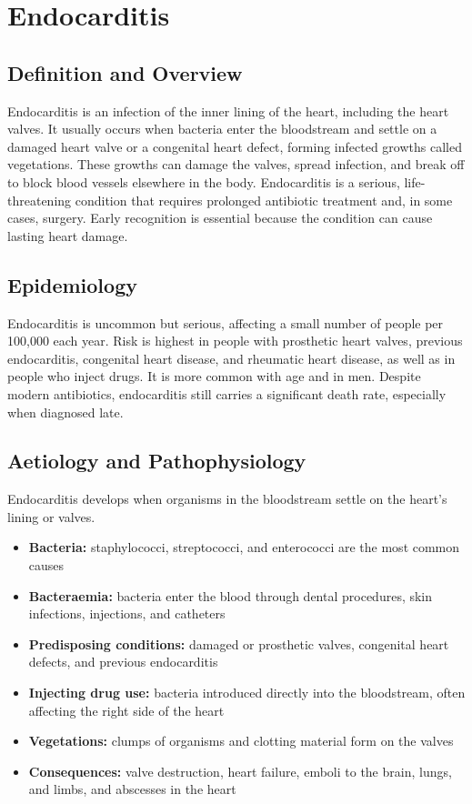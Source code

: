 \chapter{Endocarditis}

\section*{Definition and Overview}
Endocarditis is an infection of the inner lining of the heart, including the heart valves. It usually occurs when bacteria enter the bloodstream and settle on a damaged heart valve or a congenital heart defect, forming infected growths called vegetations. These growths can damage the valves, spread infection, and break off to block blood vessels elsewhere in the body. Endocarditis is a serious, life-threatening condition that requires prolonged antibiotic treatment and, in some cases, surgery. Early recognition is essential because the condition can cause lasting heart damage.

\section*{Epidemiology}
Endocarditis is uncommon but serious, affecting a small number of people per 100,000 each year. Risk is highest in people with prosthetic heart valves, previous endocarditis, congenital heart disease, and rheumatic heart disease, as well as in people who inject drugs. It is more common with age and in men. Despite modern antibiotics, endocarditis still carries a significant death rate, especially when diagnosed late.

\section*{Aetiology and Pathophysiology}
Endocarditis develops when organisms in the bloodstream settle on the heart's lining or valves.
\begin{itemize}
    \item \textbf{Bacteria:} staphylococci, streptococci, and enterococci are the most common causes
    \item \textbf{Bacteraemia:} bacteria enter the blood through dental procedures, skin infections, injections, and catheters
    \item \textbf{Predisposing conditions:} damaged or prosthetic valves, congenital heart defects, and previous endocarditis
    \item \textbf{Injecting drug use:} bacteria introduced directly into the bloodstream, often affecting the right side of the heart
    \item \textbf{Vegetations:} clumps of organisms and clotting material form on the valves
    \item \textbf{Consequences:} valve destruction, heart failure, emboli to the brain, lungs, and limbs, and abscesses in the heart
\end{itemize}

